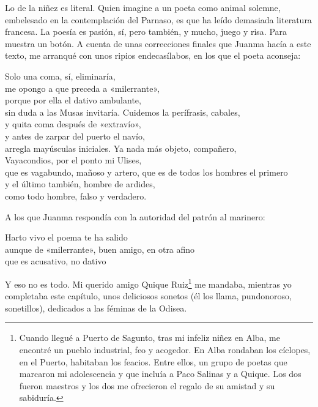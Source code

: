 
Lo de la niñez es literal. Quien imagine a un poeta como animal solemne, embelesado en la contemplación del Parnaso, es que ha leído demasiada literatura francesa. La poesía es pasión, sí, pero también, y mucho, juego y risa. Para muestra un botón. A cuenta de unas correcciones finales que Juanma hacía a este texto, me arranqué con unos ripios endecasílabos, en los que el poeta aconseja:

\begin{versopropio}
Solo una coma, sí, eliminaría,\\
me opongo a que preceda a «milerrante»,\\
porque por ella el dativo ambulante,\\
sin duda a las Musas invitaría.
\stanzabreak
Cuidemos la perífrasis, cabales,\\
y quita coma después de «extravío»,\\
y antes de zarpar del puerto el navío,\\
arregla mayúsculas iniciales.
\stanzabreak
Ya nada más objeto, compañero,\\
Vayacondios, por el ponto mi Ulises,\\
que es vagabundo, mañoso y artero,
\stanzabreak
que es de todos los hombres el primero\\
y el último también, hombre de ardides,\\
como todo hombre, falso y verdadero.
\end{versopropio}

A los que Juanma respondía con la autoridad del patrón al marinero:

\begin{versocita}
Harto vivo el poema te ha salido\\
aunque de «milerrante», buen amigo, en otra afino\\
que es acusativo, no dativo
\end{versocita}

Y eso no es todo. Mi querido amigo Quique Ruiz\footnote{Cuando llegué a Puerto de Sagunto, tras mi infeliz niñez en Alba, me encontré un pueblo industrial, feo y acogedor. En Alba rondaban los cíclopes, en el Puerto, habitaban los feacios. Entre ellos, un grupo de poetas que marcaron mi adolescencia y que incluía a Paco Salinas y a Quique. Los dos fueron maestros y los dos me ofrecieron el regalo de su amistad y su sabiduría.} me mandaba, mientras yo completaba este capítulo, unos deliciosos sonetos (él los llama, pundonoroso, sonetillos), dedicados a las féminas de la Odisea.

